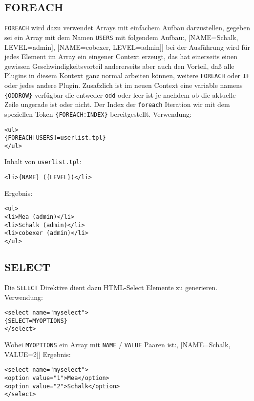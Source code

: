 \documentclass[a4paper,10pt]{article}
\begin{document}
\subsection{FOREACH}
{\tt FOREACH} wird dazu verwendet Arrays mit einfachem Aufbau darzustellen,
gegeben sei ein Array mit dem Namen {\tt USERS} mit folgendem Aufbau:\newline
[[NAME=Mea, LEVEL=admin], [NAME=Schalk, LEVEL=admin], [NAME=cobexer, LEVEL=admin]]\newline
bei der Ausf\"uhrung wird f\"ur jedes Element im Array ein eingener Context erzeugt, das hat einerseits
einen gewissen Geschwindigkeitsvorteil andererseits aber auch den Vorteil, da\ss{} alle Plugins in diesem
Kontext ganz normal arbeiten k\"onnen, weitere {\tt FOREACH} oder {\tt IF} oder jedes andere Plugin.\newline
Zusa\"tzlich ist im neuen Context eine variable namens {\tt \{ODDROW\}} verf\"ugbar die entweder {\tt odd} oder leer ist
je nachdem ob die aktuelle Zeile ungerade ist oder nicht.\newline
Der Index der {\tt foreach} Iteration wir mit dem speziellen Token {\tt \{FOREACH:INDEX\}} bereitgestellt.\newline
Verwendung:
\lstset{language=HTML}
\begin{lstlisting}
<ul>
{FOREACH[USERS]=userlist.tpl}
</ul>
\end{lstlisting}
Inhalt von \texttt{userlist.tpl}:
\begin{lstlisting}
<li>{NAME} ({LEVEL})</li>
\end{lstlisting}
Ergebnis:
\begin{lstlisting}
<ul>
<li>Mea (admin)</li>
<li>Schalk (admin)</li>
<li>cobexer (admin)</li>
</ul>
\end{lstlisting}


\subsection{SELECT}
Die {\tt SELECT} Direktive dient dazu HTML-Select Elemente zu generieren. Verwendung:\newline
\begin{lstlisting}
<select name="myselect">
{SELECT=MYOPTIONS}
</select>
\end{lstlisting}
Wobei {\tt MYOPTIONS} ein Array mit {\tt NAME} / {\tt VALUE} Paaren ist:\newline
[[NAME=Mea, VALUE=1], [NAME=Schalk, VALUE=2]]\newline
Ergebnis:
\begin{lstlisting}
<select name="myselect">
<option value="1">Mea</option>
<option value="2">Schalk</option>
</select>
\end{lstlisting}
\end{document}
